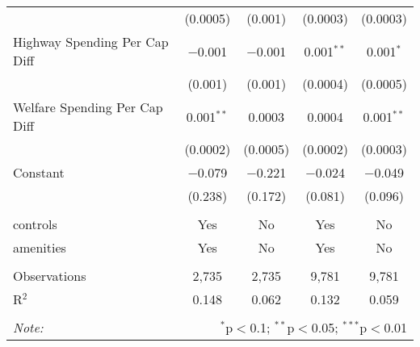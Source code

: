 \begin{table}[!htbp]
\begin{tabular}{@{\extracolsep{5pt}}lcccc}
  & (0.0005) & (0.001) & (0.0003) & (0.0003) \\ 
  Highway Spending Per Cap Diff & $-$0.001 & $-$0.001 & 0.001$^{**}$ & 0.001$^{*}$ \\ 
  & (0.001) & (0.001) & (0.0004) & (0.0005) \\ 
  Welfare Spending Per Cap Diff & 0.001$^{**}$ & 0.0003 & 0.0004 & 0.001$^{**}$ \\ 
  & (0.0002) & (0.0005) & (0.0002) & (0.0003) \\ 
  Constant & $-$0.079 & $-$0.221 & $-$0.024 & $-$0.049 \\ 
  & (0.238) & (0.172) & (0.081) & (0.096) \\ 
 \hline \\[-1.8ex] 
controls & Yes & No & Yes & No \\ 
amenities & Yes & No & Yes & No \\ 
\hline \\[-1.8ex] 
Observations & 2,735 & 2,735 & 9,781 & 9,781 \\ 
R$^{2}$ & 0.148 & 0.062 & 0.132 & 0.059 \\ 
\hline 
\hline \\[-1.8ex] 
\textit{Note:}  & \multicolumn{4}{r}{$^{*}$p$<$0.1; $^{**}$p$<$0.05; $^{***}$p$<$0.01} \\ 
\end{tabular} 
\end{table} 
